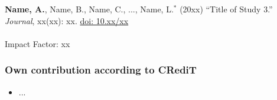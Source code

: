 \documentclass[float=true, crop=false]{standalone}
\begin{document}
\textbf{Name, A.}, Name, B., Name, C., ..., Name, L.$^{*}$ (20xx) \enquote{Title of Study 3.} \textit{Journal}, xx(xx): xx. \href{https://doi.org/10.xx/xx}{doi: 10.xx/xx}\\
\\
Impact Factor: xx\\

\subsubsection*{Own contribution according to CRediT}
\begin{itemize}
    \item ...
\end{itemize}
\end{document}
